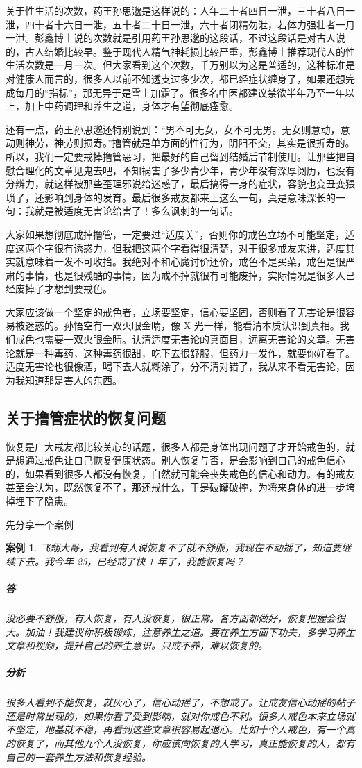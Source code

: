 \documentclass[fontset=founder]{ctexart}
\newtheorem{case}{案例}
\begin{document}
关于性生活的次数，药王孙思邈是这样说的：人年二十者四日一泄，三十者八日一泄，四十者十六日一泄，五十者二十日一泄，六十者闭精勿泄，若体力强壮者一月一泄。彭鑫博士说的次数就是引用药王孙思邈的这段话，不过这段话是对古人说的，古人结婚比较早。鉴于现代人精气神耗损比较严重，彭鑫博士推荐现代人的性生活次数是一月一次。但大家看到这个次数，千万别以为这是普适的，这种标准是对健康人而言的，很多人以前不知透支过多少次，都已经症状缠身了，如果还想完成每月的“指标”，那无异于是雪上加霜了。很多名中医都建议禁欲半年乃至一年以上，加上中药调理和养生之道，身体才有望彻底痊愈。

还有一点，药王孙思邈还特别说到：“男不可无女，女不可无男。无女则意动，意动则神劳，神劳则损寿。”撸管就是单方面的性行为，阴阳不交，其实是很折寿的。所以，我们一定要戒掉撸管恶习，把最好的自己留到结婚后节制使用。让那些把自慰合理化的文章见鬼去吧，不知祸害了多少青少年，青少年没有深厚阅历，也没有分辨力，就这样被那些歪理邪说给迷惑了，最后搞得一身的症状，容貌也变丑变猥琐了，还影响到身体的发育。最后很多戒友都来上这么一句，真是意味深长的一句：我就是被适度无害论给害了！多么讽刺的一句话。

大家如果想彻底戒掉撸管，一定要过“适度关”，否则你的戒色立场不可能坚定，适度这两个字很有诱惑力，但我把这两个字看得很清楚，对于很多戒友来讲，适度其实就意味着一发不可收拾。我绝对不和心魔讨价还价，戒色不是买菜，戒色是很严肃的事情，也是很残酷的事情，因为戒不掉就很有可能废掉，实际情况是很多人已经废掉了才想到要戒色。

大家应该做一个坚定的戒色者，立场要坚定，信心要坚固，否则看了无害论是很容易被迷惑的。孙悟空有一双火眼金睛，像 X 光一样，能看清本质认识到真相。我们戒色也需要一双火眼金睛。认清适度无害论的真面目，远离无害论的文章。无害论就是一种毒药，这种毒药很甜，吃下去很舒服，但药力一发作，就要你好看了。适度无害论也很像酒，喝下去人就糊涂了，分不清对错了，我从来不看无害论，因为我知道那是害人的东西。

\subsection{关于撸管症状的恢复问题}

恢复是广大戒友都比较关心的话题，很多人都是身体出现问题了才开始戒色的，就是想通过戒色让自己恢复健康状态。别人恢复与否，是会影响到自己的戒色信心的，如果看到很多人都没有恢复，自然就可能会丧失戒色的信心和动力。有的戒友甚至会认为，既然恢复不了，那还戒什么，于是破罐破摔，为将来身体的进一步垮掉埋下了隐患。

先分享一个案例

\begin{case}
    飞翔大哥，我看到有人说恢复不了就不舒服，我现在不动摇了，知道要继续下去。我今年 23，已经戒了快 1 年了，我能恢复吗？
    \subparagraph{答} 没必要不舒服，有人恢复，有人没恢复，很正常。各方面都做好，恢复把握会很大。加油！我建议你积极锻炼，注意养生之道。要在养生方面下功夫，多学习养生文章和视频，提升自己的养生意识。只戒不养，难以恢复的。
    \subparagraph{分析} 很多人看到不能恢复，就灰心了，信心动摇了，不想戒了。让戒友信心动摇的帖子还是时常出现的，如果你看了受到影响，就对你戒色不利。很多人戒色本来立场就不坚定，地基就不稳，再看到这些文章很容易起退心。比如十个人戒色，有一个真的恢复了，而其他九个人没恢复，你应该向恢复的人学习，真正能恢复的人，都有自己的一套养生方法和恢复经验。
\end{case}
\end{document}
